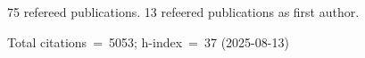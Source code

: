 75 refereed publications. 13 refeered publications as first author.

Total citations~=~5053; h-index~=~37 (2025-08-13)